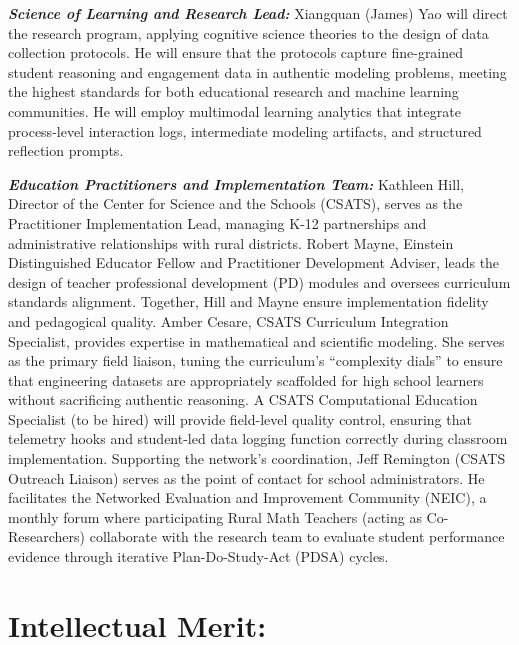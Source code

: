 \documentclass[11pt]{article}
\begin{document}
\textit{\textbf{Science of Learning and Research Lead:}}
Xiangquan (James) Yao will direct the research program, applying cognitive science theories to the design of data collection protocols.
He will ensure that the protocols capture fine-grained student reasoning and engagement data in authentic modeling problems, meeting the highest standards for both educational research and machine learning communities.
He will employ multimodal learning analytics that integrate process-level interaction logs, intermediate modeling artifacts, and structured reflection prompts.

\textit{\textbf{Education Practitioners and Implementation Team:}}
Kathleen Hill, Director of the Center for Science and the Schools (CSATS), serves as the Practitioner Implementation Lead, managing K-12 partnerships and administrative relationships with rural districts. Robert Mayne, Einstein Distinguished Educator Fellow and Practitioner Development Adviser, leads the design of teacher professional development (PD) modules and oversees curriculum standards alignment. Together, Hill and Mayne ensure implementation fidelity and pedagogical quality.
Amber Cesare, CSATS Curriculum Integration Specialist, provides expertise in mathematical and scientific modeling. She serves as the primary field liaison, tuning the curriculum’s “complexity dials” to ensure that engineering datasets are appropriately scaffolded for high school learners without sacrificing authentic reasoning. A CSATS Computational Education Specialist (to be hired) will provide field-level quality control, ensuring that telemetry hooks and student-led data logging function correctly during classroom implementation.
Supporting the network’s coordination, Jeff Remington (CSATS Outreach Liaison) serves as the point of contact for school administrators. He facilitates the Networked Evaluation and Improvement Community (NEIC), a monthly forum where participating Rural Math Teachers (acting as Co-Researchers) collaborate with the research team to evaluate student performance evidence through iterative Plan-Do-Study-Act (PDSA) cycles.

\section{Intellectual Merit:}
\end{document}
